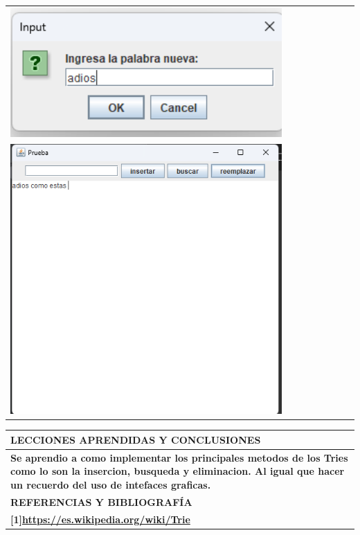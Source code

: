 \documentclass[9pt]{article}
\begin{document}
\begin{longtable}{|p{15cm}|}
		\includegraphics[width=0.8\textwidth,keepaspectratio]{img/reemplazando2.png}\\
		\includegraphics[width=0.8\textwidth,keepaspectratio]{img/reemplazo.png}\\
		
		\hline
	\end{longtable}
	\begin{table}[H]
		\begin{tabular}{|p{15cm}|}
			\hline 
			\rowcolor{tablebackground}
			\color{white}\textbf{LECCIONES APRENDIDAS Y CONCLUSIONES}  \\
			\hline 
			\textbf{Se aprendio a como implementar los principales metodos de los Tries
			como lo son la insercion, busqueda y eliminacion. Al igual que hacer un recuerdo del uso
			de intefaces graficas.}\\
		\hline 
		\rowcolor{tablebackground}
		\color{white}\textbf{REFERENCIAS Y BIBLIOGRAFÍA}  \\
		\hline 
		\textbf{[1]\url{https://es.wikipedia.org/wiki/Trie}}\\
		\hline 
	\end{tabular}
\end{table}
\end{document}
